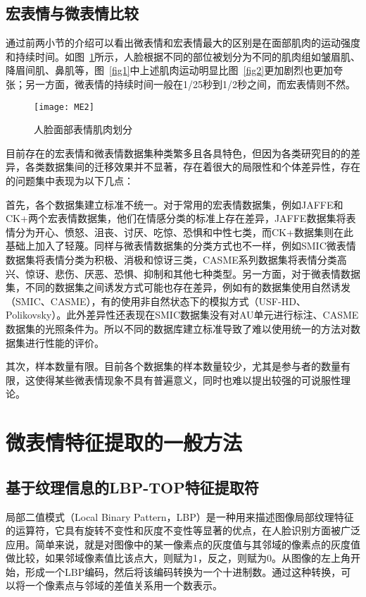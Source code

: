 \subsection{宏表情与微表情比较}

通过前两小节的介绍可以看出微表情和宏表情最大的区别是在面部肌肉的运动强度和持续时间。如图~\ref{fig4}所示，人脸根据不同的部位被划分为不同的肌肉组如皱眉肌、降眉间肌、鼻肌等，图~\ref{fig1}中上述肌肉运动明显比图~\ref{fig2}更加剧烈也更加夸张；另一方面，微表情的持续时间一般在1/25秒到1/2秒之间，而宏表情则不然。

\begin{figure}[!htbp]
    \centering
    \texttt{[image: ME2]}
    \caption{人脸面部表情肌肉划分}
    \label{fig4}
\end{figure}

目前存在的宏表情和微表情数据集种类繁多且各具特色，但因为各类研究目的的差异，各类数据集间的迁移效果并不显著，存在着很大的局限性和个体差异性，存在的问题集中表现为以下几点：

首先，各个数据集建立标准不统一。对于常用的宏表情数据集，例如JAFFE和CK+两个宏表情数据集，他们在情感分类的标准上存在差异，JAFFE数据集将表情分为开心、愤怒、沮丧、讨厌、吃惊、恐惧和中性七类，而CK+数据集则在此基础上加入了轻蔑。同样与微表情数据集的分类方式也不一样，例如SMIC微表情数据集将表情分类为积极、消极和惊讶三类，CASME系列数据集将表情分类高兴、惊讶、悲伤、厌恶、恐惧、抑制和其他七种类型。另一方面，对于微表情数据集，不同的数据集之间诱发方式可能也存在差异，例如有的数据集使用自然诱发（SMIC、CASME），有的使用非自然状态下的模拟方式（USF-HD、Polikovsky）。此外差异性还表现在SMIC数据集没有对AU单元进行标注、CASME数据集的光照条件为。所以不同的数据库建立标准导致了难以使用统一的方法对数据集进行性能的评价。

其次，样本数量有限。目前各个数据集的样本数量较少，尤其是参与者的数量有限，这使得某些微表情现象不具有普遍意义，同时也难以提出较强的可说服性理论。



\section{微表情特征提取的一般方法}

\subsection{基于纹理信息的LBP-TOP特征提取符}

局部二值模式（Local Binary Pattern，LBP）是一种用来描述图像局部纹理特征的运算符，它具有旋转不变性和灰度不变性等显著的优点，在人脸识别方面被广泛应用\citep{Ojala2002Gray}。简单来说，就是对图像中的某一像素点的灰度值与其邻域的像素点的灰度值做比较，如果邻域像素值比该点大，则赋为1，反之，则赋为0。从图像的左上角开始，形成一个LBP编码，然后将该编码转换为一个十进制数。通过这种转换，可以将一个像素点与邻域的差值关系用一个数表示。

